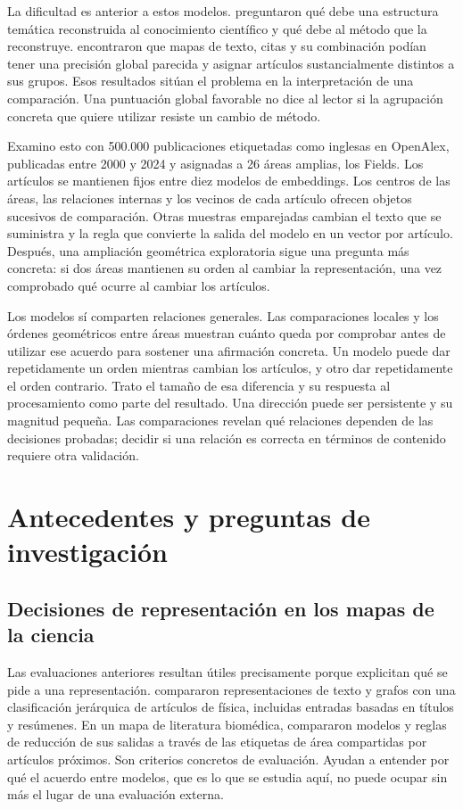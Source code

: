 \documentclass[12pt]{article}
\begin{document}
La dificultad es anterior a estos modelos. \citet{refa0d2d707e6} preguntaron qué debe una estructura temática reconstruida al conocimiento científico y qué debe al método que la reconstruye. \citet{ref6a2f5912bc} encontraron que mapas de texto, citas y su combinación podían tener una precisión global parecida y asignar artículos sustancialmente distintos a sus grupos. Esos resultados sitúan el problema en la interpretación de una comparación. Una puntuación global favorable no dice al lector si la agrupación concreta que quiere utilizar resiste un cambio de método.

Examino esto con 500.000 publicaciones etiquetadas como inglesas en OpenAlex, publicadas entre 2000 y 2024 y asignadas a 26 áreas amplias, los Fields. Los artículos se mantienen fijos entre diez modelos de embeddings. Los centros de las áreas, las relaciones internas y los vecinos de cada artículo ofrecen objetos sucesivos de comparación. Otras muestras emparejadas cambian el texto que se suministra y la regla que convierte la salida del modelo en un vector por artículo. Después, una ampliación geométrica exploratoria sigue una pregunta más concreta: si dos áreas mantienen su orden al cambiar la representación, una vez comprobado qué ocurre al cambiar los artículos.

Los modelos sí comparten relaciones generales. Las comparaciones locales y los órdenes geométricos entre áreas muestran cuánto queda por comprobar antes de utilizar ese acuerdo para sostener una afirmación concreta. Un modelo puede dar repetidamente un orden mientras cambian los artículos, y otro dar repetidamente el orden contrario. Trato el tamaño de esa diferencia y su respuesta al procesamiento como parte del resultado. Una dirección puede ser persistente y su magnitud pequeña. Las comparaciones revelan qué relaciones dependen de las decisiones probadas; decidir si una relación es correcta en términos de contenido requiere otra validación.

\section{Antecedentes y preguntas de investigación}
\subsection{Decisiones de representación en los mapas de la ciencia}
Las evaluaciones anteriores resultan útiles precisamente porque explicitan qué se pide a una representación. \citet{refc0e2cc29e0} compararon representaciones de texto y grafos con una clasificación jerárquica de artículos de física, incluidas entradas basadas en títulos y resúmenes. En un mapa de literatura biomédica, \citet{refbe130e2973} compararon modelos y reglas de reducción de sus salidas a través de las etiquetas de área compartidas por artículos próximos. Son criterios concretos de evaluación. Ayudan a entender por qué el acuerdo entre modelos, que es lo que se estudia aquí, no puede ocupar sin más el lugar de una evaluación externa.
\end{document}
